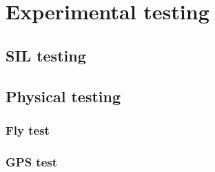 
\chapter{Experimental testing}
\section{SIL testing}
\section{Physical testing}
\subsection{Fly test}
\subsection{GPS test}
\cleardoublepage